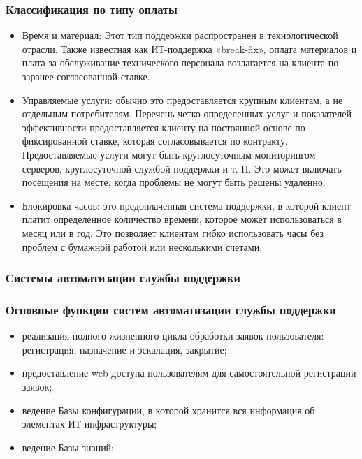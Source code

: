 \documentclass{../industrial-development}
\begin{document}
\begin{frame} \frametitle{Классификация по типу оплаты}
	\begin{itemize} 
		\item Время и материал: Этот тип поддержки распространен в технологической отрасли. Также известная как ИТ-поддержка «break-fix», оплата материалов и плата за обслуживание технического персонала возлагается на клиента по заранее согласованной ставке.
        \item Управляемые услуги: обычно это предоставляется крупным клиентам, а не отдельным потребителям. Перечень четко определенных услуг и показателей эффективности предоставляется клиенту на постоянной основе по фиксированной ставке, которая согласовывается по контракту. Предоставляемые услуги могут быть круглосуточным мониторингом серверов, круглосуточной службой поддержки и т. П. Это может включать посещения на месте, когда проблемы не могут быть решены удаленно.
        \item Блокировка часов: это предоплаченная система поддержки, в которой клиент платит определенное количество времени, которое может использоваться в месяц или в год. Это позволяет клиентам гибко использовать часы без проблем с бумажной работой или несколькими счетами. 
	\end{itemize}
\end{frame}

\lecturenotes

\begin{frame} \frametitle{Системы автоматизации службы поддержки}

\end{frame}
\lecturenotes


\begin{frame} \frametitle{Основные функции систем автоматизации службы поддержки}
	\begin{itemize} 
		\item реализация полного жизненного цикла обработки заявок пользователя: регистрация, назначение и эскалация, закрытие;
		\item предоставление web-доступа пользователям для самостоятельной регистрации заявок;
		\item ведение Базы конфигурации, в которой хранится вся информация об элементах ИТ-инфраструктуры;
		\item ведение Базы знаний;
	\end{itemize}
\end{frame}
\lecturenotes
\end{document}
